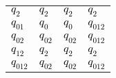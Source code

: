 \documentclass[11pt,fleqn]{article}
\begin{document}
\begin{enumerate}
\begin{center}
\begin{tabular}{|p{1cm}|p{1cm}|p{1cm}|p{1cm}|}
         \textcolor{black}{\sout{$q_2$}} & \textcolor{black}{\sout{$q_2$}} &
         \textcolor{black}{\sout{$q_2$}} & \textcolor{black}{\sout{$q_2$}}\\
         
         \textcolor{black}{$q_{01}$} & \textcolor{black}{$q_0$} &
         \textcolor{black}{$q_0$} & \textcolor{black}{$q_{012}$}\\ 
         
         \textcolor{black}{$q_{02}$} & \textcolor{black}{$q_{02}$} &
         \textcolor{black}{$q_{02}$} & \textcolor{black}{$q_{012}$}\\
         
         \textcolor{black}{\sout{$q_{12}$}} & \textcolor{black}{\sout{$q_2$}} &
         \textcolor{black}{\sout{$q_2$}} & \textcolor{black}{\sout{$q_2$}}\\
         
         \textcolor{black}{$q_{012}$} & \textcolor{black}{$q_{02}$} &
         \textcolor{black}{$q_{02}$} & \textcolor{black}{$q_{012}$}\\
         \hline
    	\end{tabular}
    	

\end{center}
\end{enumerate}
\end{document}
